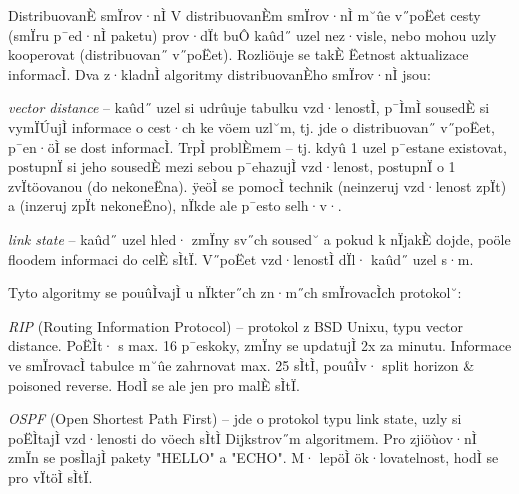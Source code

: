 \medskip
\begin{obecne}{DistribuovanÈ smÏrov·nÌ}
V distribuovanÈm smÏrov·nÌ m˘ûe v˝poËet cesty (smÏru p¯ed·nÌ paketu) prov·dÏt buÔ kaûd˝ uzel nez·visle, nebo mohou uzly kooperovat (distribuovan˝ v˝poËet). Rozliöuje se takÈ Ëetnost aktualizace informacÌ. Dva z·kladnÌ algoritmy distribuovanÈho smÏrov·nÌ jsou:
\begin{pitemize}
    \item \emph{vector distance} -- kaûd˝ uzel si udrûuje tabulku vzd·lenostÌ, p¯ÌmÌ sousedÈ si vymÏÚujÌ informace o cest·ch ke vöem uzl˘m, tj. jde o distribuovan˝ v˝poËet, p¯en·öÌ se dost informacÌ. TrpÌ problÈmem  -- tj. kdyû 1 uzel p¯estane existovat, postupnÏ si jeho sousedÈ mezi sebou p¯ehazujÌ vzd·lenost, postupnÏ o 1 zvÏtöovanou (do nekoneËna). ÿeöÌ se pomocÌ technik  (neinzeruj vzd·lenost zpÏt) a  (inzeruj zpÏt nekoneËno), nÏkde ale p¯esto selh·v·.
    \item \emph{link state} -- kaûd˝ uzel hled· zmÏny sv˝ch soused˘ a pokud k nÏjakÈ dojde, poöle floodem informaci do celÈ sÌtÏ. V˝poËet vzd·lenostÌ dÏl· kaûd˝ uzel s·m.
\end{pitemize}
Tyto algoritmy se pouûÌvajÌ u nÏkter˝ch zn·m˝ch smÏrovacÌch protokol˘:
\begin{pitemize}
    \item \emph{RIP} (Routing Information Protocol) -- protokol z BSD Unixu, typu vector distance. PoËÌt· s max. 16 p¯eskoky, zmÏny se updatujÌ 2x za minutu. Informace ve smÏrovacÌ tabulce m˘ûe zahrnovat max. 25 sÌtÌ, pouûÌv· split horizon \& poisoned reverse. HodÌ se ale jen pro malÈ sÌtÏ.
    \item \emph{OSPF} (Open Shortest Path First) -- jde o protokol typu link state, uzly si poËÌtajÌ vzd·lenosti do vöech sÌtÌ Dijkstrov˝m algoritmem. Pro zjiöùov·nÌ zmÏn se posÌlajÌ pakety "HELLO" a "ECHO". M· lepöÌ ök·lovatelnost, hodÌ se pro vÏtöÌ sÌtÏ.
\end{pitemize}
\end{obecne}

